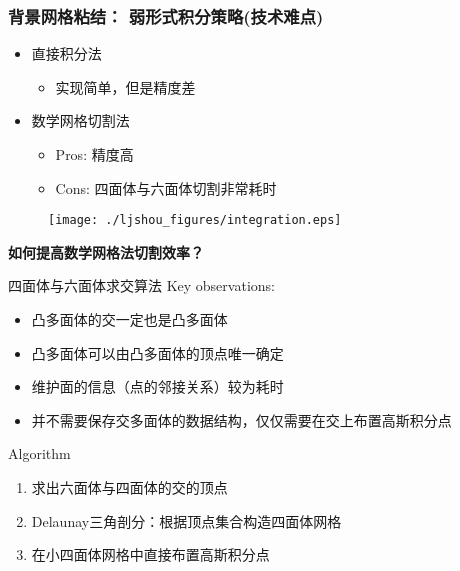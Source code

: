 \documentclass[mathserif]{beamer}
\begin{document}
\begin{CJK}{UTF8}{gkai}
        \begin{frame}
			\frametitle{背景网格粘结： 弱形式积分策略(技术难点)}
			\begin{itemize}
				\item 直接积分法
				    \begin{itemize}
				        \item 实现简单，但是精度差
				    \end{itemize}
				\item 数学网格切割法
    				\begin{itemize}
    					\item Pros: 精度高
                        \item Cons: 四面体与六面体切割非常耗时
    				\end{itemize}
			\end{itemize}
			\begin{figure}
					\centering
					\texttt{[image: ./ljshou\_figures/integration.eps]}
			\end{figure}
			\begin{block}{}
				\bf \color{red} 如何提高数学网格法切割效率？
			\end{block}
		\end{frame}
		
		\begin{frame}{四面体与六面体求交算法}
		    Key observations:
                \begin{itemize}
                    \item 凸多面体的交一定也是凸多面体
                    \item 凸多面体可以由凸多面体的顶点唯一确定
                    \item 维护面的信息（点的邻接关系）较为耗时
                    \item 并不需要保存交多面体的数据结构，仅仅需要在交上布置高斯积分点
                \end{itemize}
                    
                \begin{block}{Algorithm}
                \begin{enumerate}
                    \item 求出六面体与四面体的交的顶点
                    \item Delaunay三角剖分：根据顶点集合构造四面体网格
                    \item 在小四面体网格中直接布置高斯积分点
                \end{enumerate}
                \end{block}
		\end{frame}
		

\end{CJK}
\end{document}
